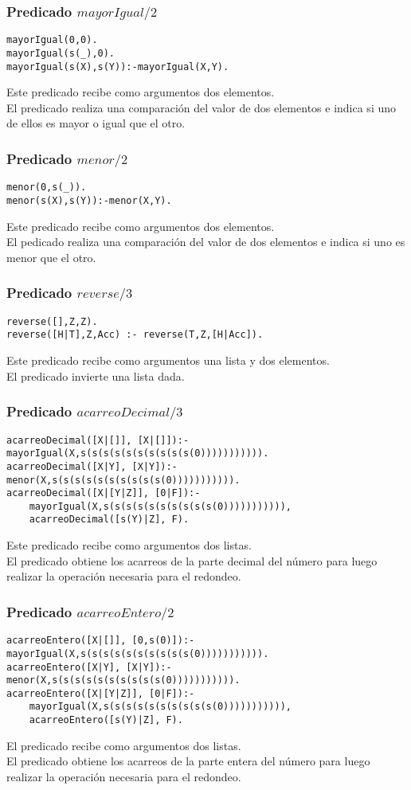 \documentclass[11pt, a4paper]{article}
\begin{document}
\subsubsection{Predicado $mayorIgual/2$}
\begin{lstlisting}[frame=single]
mayorIgual(0,0).
mayorIgual(s(_),0).
mayorIgual(s(X),s(Y)):-mayorIgual(X,Y).
\end{lstlisting}
Este predicado recibe como argumentos dos elementos.\\
El predicado realiza una comparación del valor de dos elementos e indica si uno de ellos es mayor o igual que el otro.
\subsubsection{Predicado $menor/2$}
\begin{lstlisting}[frame=single]
menor(0,s(_)).
menor(s(X),s(Y)):-menor(X,Y).
\end{lstlisting}
Este predicado recibe como argumentos dos elementos.\\
El pedicado realiza una comparación del valor de dos elementos e indica si uno es menor que el otro.
\subsubsection{Predicado $reverse/3$}
\begin{lstlisting}[frame=single]
reverse([],Z,Z).
reverse([H|T],Z,Acc) :- reverse(T,Z,[H|Acc]).
\end{lstlisting}
Este predicado recibe como argumentos una lista y dos elementos.\\
El predicado invierte una lista dada.
\subsubsection{Predicado $acarreoDecimal/3$}
\begin{lstlisting}[frame=single]
acarreoDecimal([X|[]], [X|[]]):-mayorIgual(X,s(s(s(s(s(s(s(s(s(s(0))))))))))).
acarreoDecimal([X|Y], [X|Y]):- menor(X,s(s(s(s(s(s(s(s(s(s(0))))))))))). 
acarreoDecimal([X|[Y|Z]], [0|F]):-
    mayorIgual(X,s(s(s(s(s(s(s(s(s(s(0))))))))))),
    acarreoDecimal([s(Y)|Z], F).
\end{lstlisting}
Este predicado recibe como argumentos dos listas.\\
El predicado obtiene los acarreos de la parte decimal del número para luego realizar la operación necesaria para el redondeo.
\subsubsection{Predicado $acarreoEntero/2$}
\begin{lstlisting}[frame=single]
acarreoEntero([X|[]], [0,s(0)]):-mayorIgual(X,s(s(s(s(s(s(s(s(s(s(0))))))))))).
acarreoEntero([X|Y], [X|Y]):- menor(X,s(s(s(s(s(s(s(s(s(s(0))))))))))). 
acarreoEntero([X|[Y|Z]], [0|F]):-
    mayorIgual(X,s(s(s(s(s(s(s(s(s(s(0))))))))))),
    acarreoEntero([s(Y)|Z], F).
\end{lstlisting}
El predicado recibe como argumentos dos listas.\\
El predicado obtiene los acarreos de la parte entera del número para luego realizar la operación necesaria para el redondeo.
\end{document}
